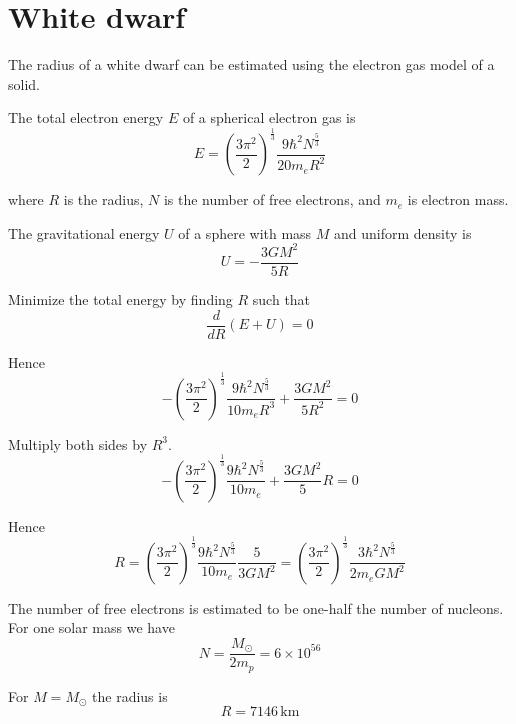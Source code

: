


\section*{White dwarf}

The radius of a white dwarf can be estimated using the electron gas model of a solid.

\bigskip
The total electron energy $E$ of a spherical electron gas is
\begin{equation*}
E=\left(\frac{3\pi^2}{2}\right)^\frac{1}{3}
\frac{9\hbar^2N^\frac{5}{3}}{20m_eR^2}
\end{equation*}

where $R$ is the radius, $N$ is the number of free electrons, and $m_e$ is electron mass.

\bigskip
The gravitational energy $U$ of a sphere with mass $M$ and uniform density is
\begin{equation*}
U=-\frac{3GM^2}{5R}
\end{equation*}

Minimize the total energy by finding $R$ such that
\begin{equation*}
\frac{d}{dR}(E+U)=0
\end{equation*}

Hence
\begin{equation*}
-\left(\frac{3\pi^2}{2}\right)^\frac{1}{3}
\frac{9\hbar^2N^\frac{5}{3}}{10m_eR^3}+\frac{3GM^2}{5R^2}=0
\end{equation*}

Multiply both sides by $R^3$.
\begin{equation*}
-\left(\frac{3\pi^2}{2}\right)^\frac{1}{3}
\frac{9\hbar^2N^\frac{5}{3}}{10m_e}+\frac{3GM^2}{5}R=0
\end{equation*}

Hence
\begin{equation*}
R=\left(\frac{3\pi^2}{2}\right)^\frac{1}{3}
\frac{9\hbar^2N^\frac{5}{3}}{10m_e}
\frac{5}{3GM^2}
=\left(\frac{3\pi^2}{2}\right)^\frac{1}{3}
\frac{3\hbar^2N^\frac{5}{3}}{2m_eGM^2}
\tag{1}
\end{equation*}

The number of free electrons is estimated to be one-half the number of nucleons.
For one solar mass we have
\begin{equation*}
N=\frac{M_{\odot}}{2m_p}=6\times10^{56}
\end{equation*}

For $M=M_{\odot}$ the radius is
\begin{equation*}
R=7146\,\text{km}
\end{equation*}


